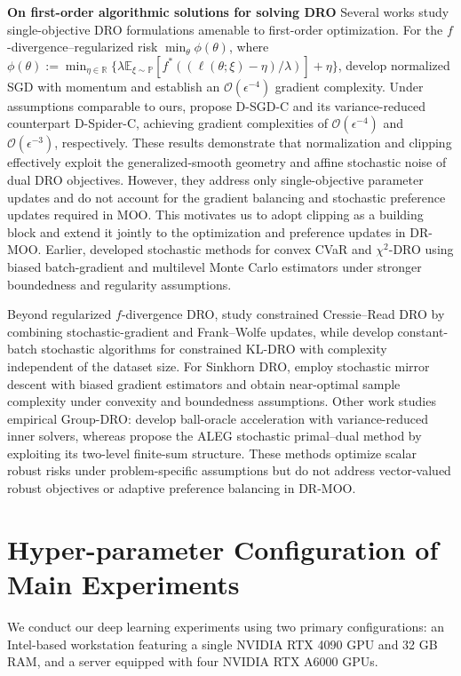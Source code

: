 \documentclass[twoside]{article} %
\theoremstyle{plain}
\theoremstyle{definition}
\theoremstyle{remark}
\begin{document}
\textbf{On first-order algorithmic solutions for solving DRO}
Several works study single-objective DRO formulations amenable to first-order optimization. For the $f$-divergence--regularized risk $\min_{\theta}\phi(\theta)$, where $\phi(\theta):=\min_{\eta\in\mathbb{R}}\{\lambda\mathbb{E}_{\xi\sim\mathbb{P}}[f^*((\ell(\theta;\xi)-\eta)/\lambda)]+\eta\}$, \citet{jinnonconvexdro} develop normalized SGD with momentum and establish an $\mathcal{O}(\epsilon^{-4})$ gradient complexity. Under assumptions comparable to ours, \citet{qirevistfDRO} propose D-SGD-C and its variance-reduced counterpart D-Spider-C, achieving gradient complexities of $\mathcal{O}(\epsilon^{-4})$ and $\mathcal{O}(\epsilon^{-3})$, respectively. These results demonstrate that normalization and clipping effectively exploit the generalized-smooth geometry and affine stochastic noise of dual DRO objectives. However, they address only single-objective parameter updates and do not account for the gradient balancing and stochastic preference updates required in MOO. This motivates us to adopt clipping as a building block and extend it jointly to the optimization and preference updates in DR-MOO. Earlier, \citet{large-scaleDRO} developed stochastic methods for convex CVaR and $\chi^2$-DRO using biased batch-gradient and multilevel Monte Carlo estimators under stronger boundedness and regularity assumptions.

Beyond regularized $f$-divergence DRO, \citet{qiaaai} study constrained Cressie--Read DRO by combining stochastic-gradient and Frank--Wolfe updates, while \citet{qiKLDRO} develop constant-batch stochastic algorithms for constrained KL-DRO with complexity independent of the dataset size. For Sinkhorn DRO, \citet{sinkhornDROwang} employ stochastic mirror descent with biased gradient estimators and obtain near-optimal sample complexity under convexity and boundedness assumptions. Other work studies empirical Group-DRO: \citet{droacceleration} develop ball-oracle acceleration with variance-reduced inner solvers, whereas \citet{yu2024efficient} propose the ALEG stochastic primal--dual method by exploiting its two-level finite-sum structure. These methods optimize scalar robust risks under problem-specific assumptions but do not address vector-valued robust objectives or adaptive preference balancing in DR-MOO.

\section{Hyper-parameter Configuration of Main Experiments}\label{Appendix: Hyper-parameter of main experiments.}
We conduct our deep learning experiments using two primary configurations: an Intel-based workstation featuring a single NVIDIA RTX 4090 GPU and 32 GB RAM, and a server equipped with four NVIDIA RTX A6000 GPUs.
\end{document}
